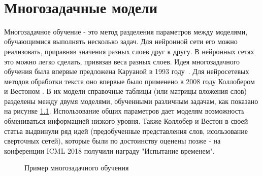   \chapter{Многозадачные модели}\label{ch:mtl} 

Многозадачное обучение - это метод разделения параметров между моделями, обучающимися выполнять несколько задач. Для нейронной сети его можно реализовать, приравняв значения разных слоев друг к другу.  В нейронных сетях это можно легко сделать, привязав веса разных слоев.  Идея многозадачного обучения была впервые предложена Каруаной в 1993 году~\cite{caruana_1997}. Для нейросетевых методов обработки текста оно впервые было применено в 2008 году Коллобером и Вестоном \cite{collobert_2008}. В их модели справочные таблицы (или матрицы вложения слов) разделены между двумя моделями, обученными различным задачам, как показано на рисунке \ref{fig:MTL1}.
Использование общих параметров дает моделям возможность обмениваться информацией низкого уровня. Также Коллобер и Вестон в своей статьа выдвинули ряд идей (предобученные представления слов, исользование сверточных сетей), которые были по достоинству оценены позже - на конференции ICML 2018 получили награду "Испытание временем".


\begin{figure}[ht]
  \caption{Пример многозадачного обучения}\label{fig:MTL1}
\end{figure}

